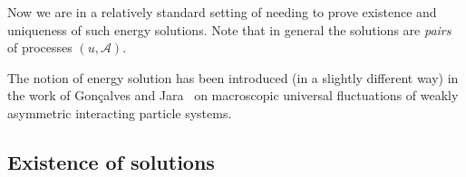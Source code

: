 \documentclass[a4paper,11pt]{article}
\newcommand{\tmem}[1]{{\em #1\/}}
\begin{document}
Now we are in a relatively standard setting of needing to prove existence and
uniqueness of such energy solutions. Note that in general the solutions are
{\tmem{pairs}} of processes $(u, \mathcal{A})$.

\begin{remark}
  The notion of energy solution has been introduced (in a slightly different
  way) in the work of Gon{\c c}alves and
  Jara~{\cite{goncalves_universality_2010}} on macroscopic universal
  fluctuations of weakly asymmetric interacting particle systems.
\end{remark}

\subsection{Existence of solutions}
\end{document}
